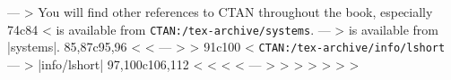 ---
> You will find other references to CTAN throughout the book, especially
74c84
< is available from \texttt{CTAN:/tex-archive/systems}.
---
> is available from \CTAN|systems|.
85,87c95,96
< %
< 
---
> %
> 
91c100
< \texttt{CTAN:/tex-archive/info/lshort}
---
> \CTAN|info/lshort|
97,100c106,112
< %
< %
< %
< %
---
> %
> 
> %
> %
> %
> %
> %
